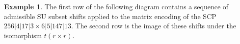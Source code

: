 \documentclass{amsart}
\theoremstyle{definition}
\newtheorem{example}[theorem]{Example}
\newcommand{\SU}{\mathrm{SU}}
\newcommand{\LA}{\mathrm{LA}}
\begin{document}
\begin{example}
\label{ex:matrix shifts}
The first row of the following diagram contains a sequence of admissible $\SU$ subset shifts applied to the matrix encoding of the SCP $256|4|17|3\times 6|5|147|13$. 
The second row is the image of these shifts under the isomorphism $t(r\times r)$.
\begin{center}
{\footnotesize
{}}
\end{center}
\end{example}
\end{document}
